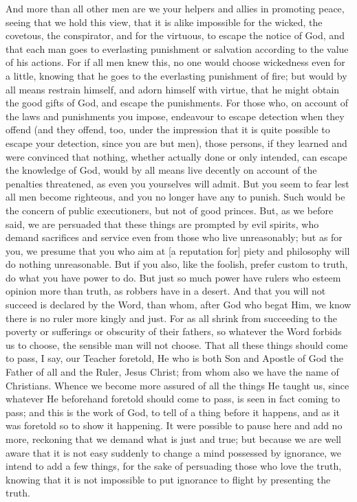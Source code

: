 
And more than all other men are we your helpers and allies in promoting peace, seeing that we hold this view, that it is alike impossible for the wicked, the covetous, the conspirator, and for the virtuous, to escape the notice of God, and that each man goes to everlasting punishment or salvation according to the value of his actions. For if all men knew this, no one would choose wickedness even for a little, knowing that he goes to the everlasting punishment of fire; but would by all means restrain himself, and adorn himself with virtue, that he might obtain the good gifts of God, and escape the punishments. For those who, on account of the laws and punishments you impose, endeavour to escape detection when they offend (and they offend, too, under the impression that it is quite possible to escape your detection, since you are but men), those persons, if they learned and were convinced that nothing, whether actually done or only intended, can escape the knowledge of God, would by all means live decently on account of the penalties threatened, as even you yourselves will admit. But you seem to fear lest all men become righteous, and you no longer have any to punish. Such would be the concern of public executioners, but not of good princes. But, as we before said, we are persuaded that these things are prompted by evil spirits, who demand sacrifices and service even from those who live unreasonably; but as for you, we presume that you who aim at [a reputation for] piety and philosophy will do nothing unreasonable. But if you also, like the foolish, prefer custom to truth, do what you have power to do. But just so much power have rulers who esteem opinion more than truth, as robbers have in a desert. And that you will not succeed is declared by the Word, than whom, after God who begat Him, we know there is no ruler more kingly and just. For as all shrink from succeeding to the poverty or sufferings or obscurity of their fathers, so whatever the Word forbids us to choose, the sensible man will not choose. That all these things should come to pass, I say, our Teacher foretold, He who is both Son and Apostle of God the Father of all and the Ruler, Jesus Christ; from whom also we have the name of Christians. Whence we become more assured of all the things He taught us, since whatever He beforehand foretold should come to pass, is seen in fact coming to pass; and this is the work of God, to tell of a thing before it happens, and as it was foretold so to show it happening. It were possible to pause here and add no more, reckoning that we demand what is just and true; but because we are well aware that it is not easy suddenly to change a mind possessed by ignorance, we intend to add a few things, for the sake of persuading those who love the truth, knowing that it is not impossible to put ignorance to flight by presenting the truth.

